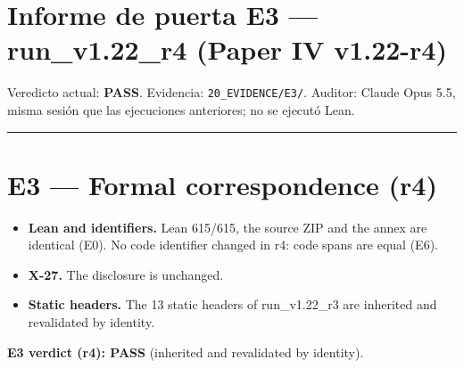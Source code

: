 \documentclass[
]{article}
\author{}
\date{}
\providecommand{\tightlist}{%
  \setlength{\itemsep}{0pt}\setlength{\parskip}{0pt}}
\begin{document}
\section{Informe de puerta E3 --- run\_v1.22\_r4 (Paper IV
v1.22-r4)}\label{informe-de-puerta-e3--run_v122_r4-paper-iv-v122-r4}

Veredicto actual: \textbf{PASS}. Evidencia: \texttt{20\_EVIDENCE/E3/}.
Auditor: Claude Opus 5.5, misma sesión que las ejecuciones anteriores;
no se ejecutó Lean.

\begin{center}\rule{0.5\linewidth}{0.5pt}\end{center}

\section{E3 --- Formal correspondence
(r4)}\label{e3--formal-correspondence-r4}

\begin{itemize}
\tightlist
\item
  \textbf{Lean and identifiers.} Lean 615/615, the source ZIP and the
  annex are identical (E0). No code identifier changed in r4: code spans
  are equal (E6).
\item
  \textbf{X-27.} The disclosure is unchanged.
\item
  \textbf{Static headers.} The 13 static headers of run\_v1.22\_r3 are
  inherited and revalidated by identity.
\end{itemize}

\textbf{E3 verdict (r4): PASS} (inherited and revalidated by identity).
\end{document}

